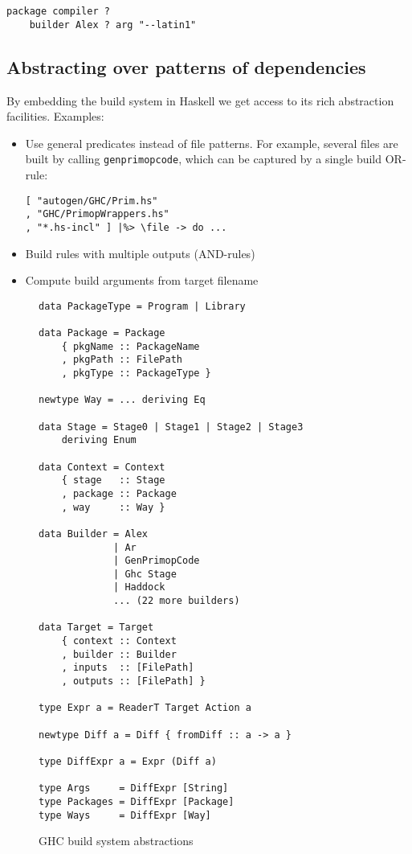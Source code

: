 \begin{verbatim}
package compiler ?
    builder Alex ? arg "--latin1"
\end{verbatim}

\subsection{Abstracting over patterns of dependencies}


By embedding the build system in Haskell we get access to its rich abstraction
facilities. Examples:
\begin{itemize}
  \item Use general predicates instead of file patterns. For example, several
  files are built by calling \texttt{genprimopcode}, which can be captured by a
  single build OR-rule:
  
\begin{lstlisting}[basicstyle=\ttfamily]
[ "autogen/GHC/Prim.hs"
, "GHC/PrimopWrappers.hs"
, "*.hs-incl" ] |%> \file -> do ...
\end{lstlisting}
  
  \item Build rules with multiple outputs (AND-rules)
  \item Compute build arguments from target filename
\end{itemize}

\begin{figure}
\begin{lstlisting}[basicstyle=\ttfamily]
data PackageType = Program | Library

data Package = Package
    { pkgName :: PackageName
    , pkgPath :: FilePath
    , pkgType :: PackageType }

newtype Way = ... deriving Eq

data Stage = Stage0 | Stage1 | Stage2 | Stage3
    deriving Enum
   
data Context = Context
    { stage   :: Stage
    , package :: Package
    , way     :: Way }

data Builder = Alex
             | Ar
             | GenPrimopCode
             | Ghc Stage
             | Haddock
             ... (22 more builders)

data Target = Target
    { context :: Context
    , builder :: Builder
    , inputs  :: [FilePath]
    , outputs :: [FilePath] }

type Expr a = ReaderT Target Action a

newtype Diff a = Diff { fromDiff :: a -> a }

type DiffExpr a = Expr (Diff a)

type Args     = DiffExpr [String]
type Packages = DiffExpr [Package]
type Ways     = DiffExpr [Way]
\end{lstlisting}
\caption{GHC build system abstractions\label{fig:abstractions}}
\end{figure}


